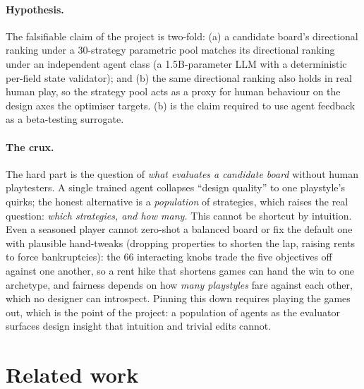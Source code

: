 \documentclass[10pt]{article}
\begin{document}
\paragraph{Hypothesis.} The falsifiable claim of the project is
two-fold: (a) a candidate board's directional ranking under a
30-strategy parametric pool matches its directional ranking under
an independent agent class (a 1.5B-parameter LLM with a
deterministic per-field state validator); and (b) the same
directional ranking also holds in real human play, so the strategy
pool acts as a proxy for human behaviour on the design axes the
optimiser targets. (b) is the claim required to use agent feedback as
a beta-testing surrogate.

\paragraph{The crux.} The hard part is the question of \emph{what
evaluates a candidate board} without human playtesters. A single trained agent collapses
``design quality'' to one playstyle's quirks; the honest alternative
is a \emph{population} of strategies, which raises the real question:
\emph{which strategies, and how many.} This cannot be shortcut by intuition. Even a seasoned player cannot
zero-shot a balanced board or fix the default one with plausible
hand-tweaks (dropping properties to shorten the lap, raising rents to
force bankruptcies): the $66$ interacting knobs trade the five
objectives off against one another, so a rent hike that shortens games
can hand the win to one archetype, and fairness depends on how
\emph{many playstyles} fare against each other, which no designer can
introspect. Pinning this down requires playing the games out, which is
the point of the project: a population of agents as the evaluator
surfaces design insight that intuition and trivial edits cannot.

\section{Related work}\label{sec:related}
\end{document}
